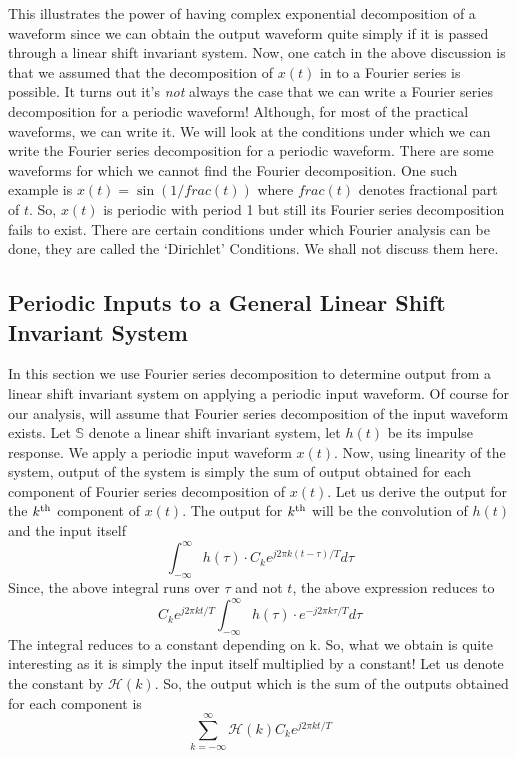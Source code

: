 This illustrates the power of having complex exponential decomposition of a waveform since we can obtain the output waveform quite simply if it is passed through a linear shift invariant system. Now, one catch in the above discussion is that we assumed that the decomposition of $x(t)$ in to a Fourier series is possible. It turns out it's \emph{not} always the case that we can write a Fourier series decomposition for a periodic waveform! Although, for most of the practical waveforms, we can write it. We will look at the conditions under which we can write the Fourier series decomposition for a periodic waveform. There are some waveforms for which we cannot find the Fourier decomposition. One such example is $x(t) = \sin{(1/frac(t))}$ where $frac(t)$ denotes fractional part of $t$. So, $x(t)$ is periodic with period 1 but still its Fourier series decomposition fails to exist. There are certain conditions under which Fourier analysis can be done, they are called the ‘Dirichlet’ Conditions. We shall not discuss them here.


\subsection{Periodic Inputs to a General Linear Shift Invariant System}

In this section we use Fourier series decomposition to determine output from a linear shift invariant system on applying a periodic input waveform. Of course for our analysis, will assume that Fourier series decomposition of the input waveform exists.
\newline
Let $\mathbb{S}$ denote a linear shift invariant system, let $h(t)$ be its impulse response. We apply a periodic input waveform $x(t)$. Now, using linearity of the system, output of the system is simply the sum of output obtained for each component of Fourier series decomposition of $x(t)$.
\newline
Let us derive the output for the $k^{\textnormal{th}}$ component of $x(t)$. The output for $k^{\textnormal{th}}$ will be the convolution of $h(t)$ and the input itself 
	$$\int_{-\infty}^{\infty}{h(\tau) \cdot C_{k}e^{j2\pi k(t- \tau)/T}}d \tau$$ Since, the above integral runs over $\tau$ and not $t$, the above expression reduces to 
    $$C_{k}e^{j2\pi kt/T}\int_{-\infty}^{\infty}{h(\tau) \cdot e^{-j2\pi k\tau/T}} d \tau$$
The integral reduces to a constant depending on k. So, what we obtain is quite interesting as it is simply the input itself multiplied by a constant!
Let us denote the constant by $\mathcal{H}(k)$. So, the output which is the sum of the outputs obtained for each component is
$$\sum_{k=-\infty}^{\infty}\mathcal{H}(k)C_{k}e^{j2\pi kt/T}$$


